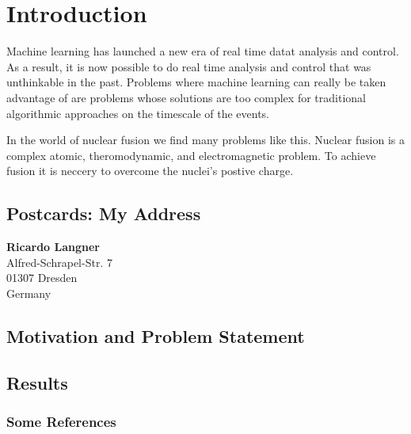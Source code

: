 %
\chapter{Introduction}
\label{sec:intro}


Machine learning has launched a new era of real time datat analysis and control.
As a result, it is now possible to do real time analysis and control that was unthinkable in the past.
Problems where machine learning can really be taken advantage of are problems whose solutions are too complex for traditional algorithmic approaches on the timescale of the events.

In the world of nuclear fusion we find many problems like this. Nuclear fusion is a complex atomic, theromodynamic, and electromagnetic problem.
To achieve fusion it is neccery to overcome the nuclei's postive charge.

\section{Postcards: My Address}
\label{sec:intro:address}

\textbf{Ricardo Langner} \\
Alfred-Schrapel-Str. 7 \\
01307 Dresden \\
Germany



\section{Motivation and Problem Statement}
\label{sec:intro:motivation}

\Blindtext[3][1] \cite{Jurgens:2000,Jurgens:1995,Miede:2011,Kohm:2011,Apple:keynote:2010,Apple:numbers:2010,Apple:pages:2010}

\section{Results}
\label{sec:intro:results}

\Blindtext[1][2]

\subsection{Some References}
\label{sec:intro:results:refs}

